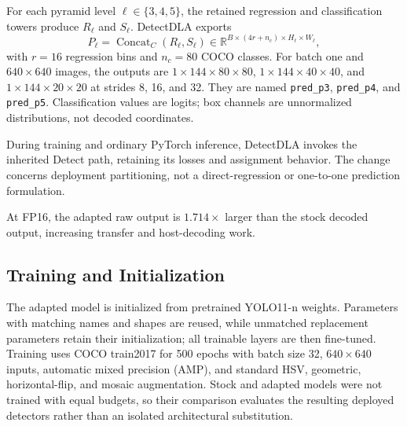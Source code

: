 For each pyramid level $\ell\in\{3,4,5\}$, the retained regression and
classification towers produce $R_\ell$ and $S_\ell$. DetectDLA exports
\begin{equation}
 P_\ell=\operatorname{Concat}_{C}(R_\ell,S_\ell)
 \in\mathbb{R}^{B\times(4r+n_c)\times H_\ell\times W_\ell},
 \label{eq:packed}
\end{equation}
with $r=16$ regression bins and $n_c=80$ COCO classes. For batch one and
$640\times640$ images, the outputs are $1\times144\times80\times80$,
$1\times144\times40\times40$, and $1\times144\times20\times20$ at strides
8, 16, and 32. They are named \texttt{pred\_p3}, \texttt{pred\_p4}, and
\texttt{pred\_p5}. Classification values are logits; box channels are
unnormalized distributions, not decoded coordinates.

During training and ordinary PyTorch inference, DetectDLA invokes the
inherited Detect path, retaining its losses and assignment behavior. The change
concerns deployment partitioning, not a direct-regression or one-to-one
prediction formulation.

At FP16, the adapted raw output is $1.714\times$ larger than the stock decoded
output, increasing transfer and host-decoding work.

\subsection{Training and Initialization}
The adapted model is initialized from pretrained YOLO11-n weights. Parameters
with matching names and shapes are reused, while unmatched replacement
parameters retain their initialization; all trainable layers are then fine-tuned.
Training uses COCO train2017 for 500 epochs with batch size 32, $640\times640$
inputs, automatic mixed precision (AMP), and standard HSV, geometric,
horizontal-flip, and mosaic augmentation. Stock and adapted models were not
trained with equal budgets, so their comparison evaluates the resulting
deployed detectors rather than an isolated architectural substitution.
